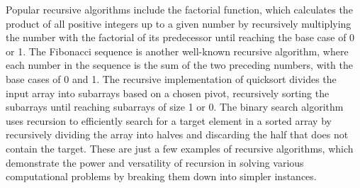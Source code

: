Popular recursive algorithms include the factorial function, which calculates the product of all positive integers up to a given number by recursively multiplying the number with the factorial of its predecessor until reaching the base case of 0 or 1. The Fibonacci sequence is another well-known recursive algorithm, where each number in the sequence is the sum of 
the two preceding numbers, with the base cases of 0 and 1. The recursive implementation of quicksort divides the input array into subarrays based on a chosen pivot, recursively sorting the subarrays until reaching subarrays of size 1 or 0. The binary search algorithm uses recursion to efficiently search for a target element in a sorted array by recursively dividing 
the array into halves and discarding the half that does not contain the target. These are just a few examples of recursive algorithms, which demonstrate the power and versatility of recursion in solving various computational problems by breaking them down into simpler instances.